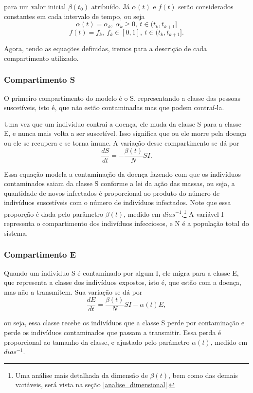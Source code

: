 \documentclass{article}
\begin{document}
	\noindent para um valor inicial $\beta(t_0)$ atribuído. Já $\alpha(t)$ e $f(t)$ serão considerados constantes em cada intervalo de tempo, ou seja
	\[\alpha(t) = \alpha_k, ~\alpha_k \geq 0, ~t \in (t_k, t_{k + 1}]\]
	\[f(t) = f_k, ~f_k \in [0, 1], ~t \in (t_k, t_{k + 1}].\]
	
	Agora, tendo as equações definidas, iremos para a descrição de cada compartimento utilizado.
	
	\subsubsection{Compartimento S}
	O primeiro compartimento do modelo é o S, representando a classe das pessoas suscetíveis, isto é, que não estão contaminadas mas que podem contraí-la.
	
	Uma vez que um indivíduo contrai a doença, ele muda da classe S para a classe E, e nunca mais volta a ser suscetível. Isso significa que ou ele morre pela doença ou ele se recupera e se torna imune. A variação desse compartimento se dá por
	\[\dfrac{dS}{dt} = -\dfrac{\beta(t)}{N}SI.\]
	
	Essa equação modela a contaminação da doença fazendo com que os indivíduos contaminados saiam da classe S conforme a lei da ação das massas, ou seja, a quantidade de novos infectados é proporcional ao produto do número de indivíduos suscetíveis com o número de indivíduos infectados. Note que essa proporção é dada pelo parâmetro $\beta(t)$, medido em $dias^{-1}$.\footnote{Uma análise mais detalhada da dimensão de $\beta(t)$, bem como das demais variáveis, será vista na seção \ref{analise_dimensional}.} A variável I representa o compartimento dos indivíduos infecciosos, e N é a população total do sistema.
	
	\subsubsection{Compartimento E}
	Quando um indivíduo S é contaminado por algum I, ele migra para a classe E, que representa a classe dos indivíduos expostos, isto é, que estão com a doença, mas não a transmitem. Sua variação se dá por
	\[\dfrac{dE}{dt} = \dfrac{\beta(t)}{N}SI - \alpha(t) E,\]
	
	\noindent ou seja, essa classe recebe os indivíduos que a classe S perde por contaminação e perde os indivíduos contaminados que passam a transmitir. Essa perda é proporcional ao tamanho da classe, e ajustado pelo parâmetro $\alpha(t)$, medido em $dias^{-1}$.
	
\end{document}
